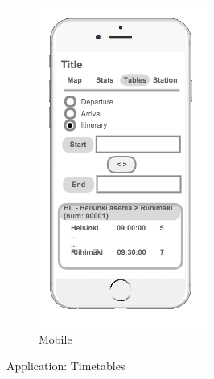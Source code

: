 \begin{figure}[ht]
\begin{subfigure}[b]{0.2\textwidth}
    \includegraphics[width=\textwidth]
      {img/c02-application/png/mobile-website-timetables.png}
    \caption{Mobile}
  \end{subfigure}
  \caption{Application: Timetables}
\end{figure}

